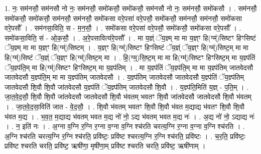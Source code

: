 \documentclass[17pt]{extarticle}
\begin{document}
1. नः॒ सम॑नसौ॒ सम॑नसौ नो नः॒ सम॑नसौ॒ समो॑कसौ॒ समो॑कसौ॒ सम॑नसौ नो नः॒ सम॑नसौ॒ समो॑कसौ । . सम॑नसौ॒ समो॑कसौ॒ समो॑कसौ॒ सम॑नसौ॒ सम॑नसौ॒ समो॑कसा वरे॒पसा॑ वरे॒पसौ॒ समो॑कसौ॒ सम॑नसौ॒ सम॑नसौ॒ समो॑कसा वरे॒पसौ᳚ । . सम॑नसा॒विति॒ स - म॒न॒सौ॒ । . समो॑कसा वरे॒पसा॑ वरे॒पसौ॒ समो॑कसौ॒ समो॑कसा वरे॒पसौ᳚ । . समो॑कसा॒विति॒ सं - ओ॒क॒सौ॒ । . अ॒रे॒पसावित्य॑रे॒पसौ᳚ । . मा य॒ज्ञ्ं ॅय॒ज्ञ्म् मा मा य॒ज्ञ्ꣳ हि(ग्म्॑)सिष्टꣳ हिꣳसिष्टं ॅय॒ज्ञ्म् मा मा य॒ज्ञ्ꣳ हि(ग्म्॑)सिष्टम् । . य॒ज्ञ्ꣳ हि(ग्म्॑)सिष्टꣳ हिꣳसिष्टं ॅय॒ज्ञ्ं ॅय॒ज्ञ्ꣳ हि(ग्म्॑)सिष्ट॒म् मा मा हि(ग्म्॑)सिष्टं ॅय॒ज्ञ्ं ॅय॒ज्ञ्ꣳ हि(ग्म्॑)सिष्ट॒म् मा । . हि॒(ग्म्॒)सि॒ष्ट॒म् मा मा हि(ग्म्॑)सिष्टꣳ हिꣳसिष्ट॒म् मा य॒ज्ञ्प॑तिं ॅय॒ज्ञ्प॑ति॒म् मा हि(ग्म्॑)सिष्टꣳ 
हिꣳसिष्ट॒म् मा य॒ज्ञ्प॑तिम् । . मा य॒ज्ञ्प॑तिं ॅय॒ज्ञ्प॑ति॒म् मा मा य॒ज्ञ्प॑तिम् जातवेदसौ जातवेदसौ य॒ज्ञ्प॑ति॒म् मा मा य॒ज्ञ्प॑तिम् जातवेदसौ । . य॒ज्ञ्प॑तिम् जातवेदसौ जातवेदसौ य॒ज्ञ्प॑तिं ॅय॒ज्ञ्प॑तिम् जातवेदसौ शि॒वौ शि॒वौ जा॑तवेदसौ य॒ज्ञ्प॑तिं ॅय॒ज्ञ्प॑तिम् जातवेदसौ शि॒वौ । . य॒ज्ञ्प॑ति॒मिति॑ य॒ज्ञ् - प॒ति॒म् । . जा॒त॒वे॒द॒सौ॒ शि॒वौ शि॒वौ जा॑तवेदसौ जातवेदसौ शि॒वौ भ॑वतम् भवतꣳ शि॒वौ जा॑तवेदसौ जातवेदसौ शि॒वौ भ॑वतम् । . जा॒त॒वे॒द॒सा॒विति॑ जात - वे॒द॒सौ॒ । . शि॒वौ भ॑वतम् भवतꣳ शि॒वौ शि॒वौ भ॑वत म॒द्याद्य भ॑वतꣳ शि॒वौ शि॒वौ भ॑वत म॒द्य । . भ॒व॒त॒ म॒द्याद्य भ॑वतम् भवत म॒द्य नो॑ नो॒ ऽद्य भ॑वतम् भवत म॒द्य नः॑ । . अ॒द्य नो॑ नो॒ ऽद्याद्य नः॑ । . न॒ इति॑ नः । . अ॒ग्ना व॒ग्नि र॒ग्नि र॒ग्ना व॒ग्ना व॒ग्नि श्च॑रति चरत्य॒ग्नि र॒ग्ना व॒ग्ना व॒ग्नि श्च॑रति । . अ॒ग्नि श्च॑रति चरत्य॒ग्नि र॒ग्नि श्च॑रति॒ प्रवि॑ष्टः॒ प्रवि॑ष्ट श्चरत्य॒ग्नि र॒ग्नि श्च॑रति॒ प्रवि॑ष्टः । . च॒र॒ति॒ प्रवि॑ष्टः॒ प्रवि॑ष्ट श्चरति चरति॒ प्रवि॑ष्ट॒ ऋषी॑णा॒ मृषी॑णा॒म् प्रवि॑ष्ट श्चरति चरति॒ प्रवि॑ष्ट॒ ऋषी॑णाम् । \newline
\end{document}
